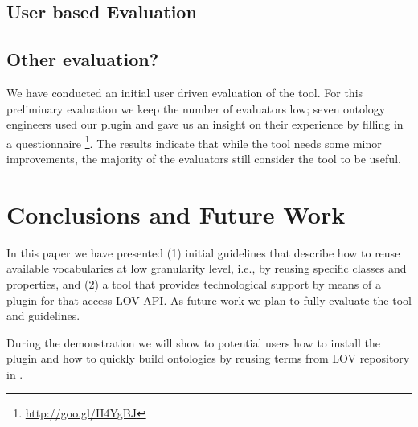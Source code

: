 
\subsection{User based Evaluation}

\subsection{Other evaluation?}

We have conducted an initial user driven evaluation of the tool. For this preliminary evaluation we keep the number of evaluators low; seven ontology engineers used our plugin and gave us an insight on their experience by filling in a questionnaire \footnote{\url{http://goo.gl/H4YgBJ}}. The results indicate that while the tool needs some minor improvements, the majority of the evaluators still consider the tool to be useful.

\vspace{-3mm}
\section{Conclusions and Future Work}\label{sec:conclusions}
In this paper we have presented (1) initial guidelines that describe how to reuse available vocabularies at low granularity level, i.e., by reusing specific classes and properties, and (2) a tool that provides technological support by means of a plugin for \protege that access LOV API. As future work we plan to fully evaluate the tool and guidelines.

During the demonstration we will show to potential users how to install the plugin and how to quickly build ontologies by reusing terms from LOV repository in \protege.

